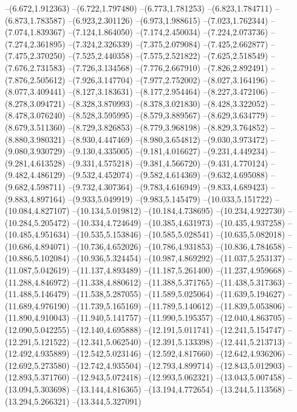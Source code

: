 --(6.672,1.912363)
--(6.722,1.797480)
--(6.773,1.781253)
--(6.823,1.784711)
--(6.873,1.783587)
--(6.923,2.301126)
--(6.973,1.988615)
--(7.023,1.762344)
--(7.074,1.839367)
--(7.124,1.864050)
--(7.174,2.450034)
--(7.224,2.073736)
--(7.274,2.361895)
--(7.324,2.326339)
--(7.375,2.079084)
--(7.425,2.662877)
--(7.475,2.370250)
--(7.525,2.440358)
--(7.575,2.521822)
--(7.625,2.518549)
--(7.676,2.731583)
--(7.726,3.134568)
--(7.776,2.667910)
--(7.826,2.892491)
--(7.876,2.505612)
--(7.926,3.147704)
--(7.977,2.752002)
--(8.027,3.164196)
--(8.077,3.409441)
--(8.127,3.183631)
--(8.177,2.954464)
--(8.227,3.472106)
--(8.278,3.094721)
--(8.328,3.870993)
--(8.378,3.021830)
--(8.428,3.322052)
--(8.478,3.076240)
--(8.528,3.595995)
--(8.579,3.889567)
--(8.629,3.634779)
--(8.679,3.511360)
--(8.729,3.826853)
--(8.779,3.968198)
--(8.829,3.764852)
--(8.880,3.980321)
--(8.930,4.447469)
--(8.980,3.654812)
--(9.030,3.973472)
--(9.080,3.930729)
--(9.130,4.335005)
--(9.181,4.016627)
--(9.231,4.449234)
--(9.281,4.613528)
--(9.331,4.575218)
--(9.381,4.566720)
--(9.431,4.770124)
--(9.482,4.486129)
--(9.532,4.452074)
--(9.582,4.614369)
--(9.632,4.695088)
--(9.682,4.598711)
--(9.732,4.307364)
--(9.783,4.616949)
--(9.833,4.689423)
--(9.883,4.897164)
--(9.933,5.049919)
--(9.983,5.145479)
--(10.033,5.151722)
--(10.084,4.827107)
--(10.134,5.019812)
--(10.184,4.738695)
--(10.234,4.922730)
--(10.284,5.205472)
--(10.334,4.724649)
--(10.385,4.631973)
--(10.435,4.937258)
--(10.485,4.951634)
--(10.535,5.153846)
--(10.585,5.028541)
--(10.635,5.082018)
--(10.686,4.894071)
--(10.736,4.652026)
--(10.786,4.931853)
--(10.836,4.784658)
--(10.886,5.102084)
--(10.936,5.324454)
--(10.987,4.869292)
--(11.037,5.253137)
--(11.087,5.042619)
--(11.137,4.893489)
--(11.187,5.261400)
--(11.237,4.959668)
--(11.288,4.846972)
--(11.338,4.880612)
--(11.388,5.371765)
--(11.438,5.317363)
--(11.488,5.146479)
--(11.538,5.287055)
--(11.589,5.025064)
--(11.639,5.194627)
--(11.689,4.976190)
--(11.739,5.165169)
--(11.789,5.140612)
--(11.839,5.053806)
--(11.890,4.910043)
--(11.940,5.141757)
--(11.990,5.195357)
--(12.040,4.863705)
--(12.090,5.042255)
--(12.140,4.695888)
--(12.191,5.011741)
--(12.241,5.154747)
--(12.291,5.121522)
--(12.341,5.062540)
--(12.391,5.133398)
--(12.441,5.213713)
--(12.492,4.935889)
--(12.542,5.023146)
--(12.592,4.817660)
--(12.642,4.936206)
--(12.692,5.273580)
--(12.742,4.935504)
--(12.793,4.899714)
--(12.843,5.012903)
--(12.893,5.371760)
--(12.943,5.072418)
--(12.993,5.062321)
--(13.043,5.007458)
--(13.094,5.303698)
--(13.144,4.816365)
--(13.194,4.772654)
--(13.244,5.113568)
--(13.294,5.266321)
--(13.344,5.327091)
